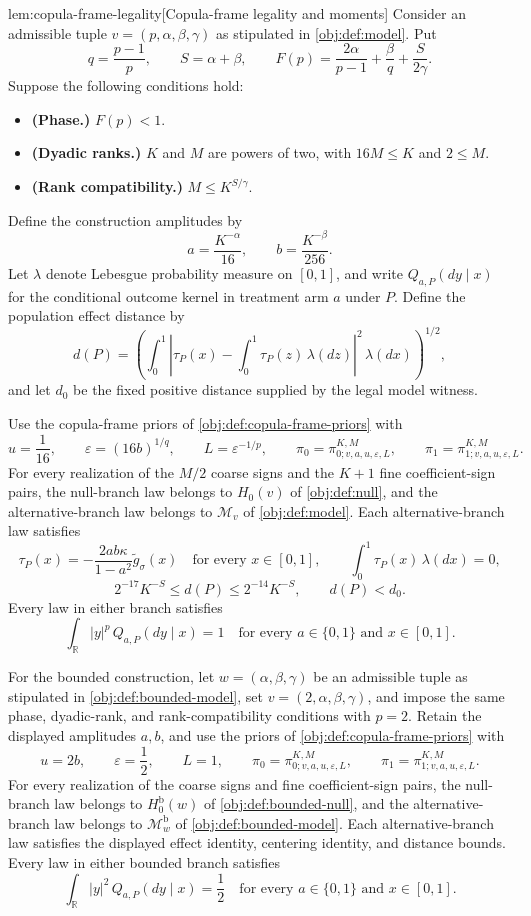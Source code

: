 \documentclass[11pt]{article}
\begin{document}
\begin{lemmav}{lem:copula-frame-legality}[Copula-frame legality and moments]
Consider an admissible tuple \(v=(p,\alpha,\beta,\gamma)\) as stipulated in \cref{obj:def:model}. Put
\[
q=\frac{p-1}{p},\qquad S=\alpha+\beta,\qquad
F(p)=\frac{2\alpha}{p-1}+\frac{\beta}{q}+\frac{S}{2\gamma}.
\]
Suppose the following conditions hold:
\begin{itemize}
\item \textbf{(Phase.)} \(F(p)<1\).
\item \textbf{(Dyadic ranks.)} \(K\) and \(M\) are powers of two, with \(16M\le K\) and \(2\le M\).
\item \textbf{(Rank compatibility.)} \(M\le K^{S/\gamma}\).
\end{itemize}
Define the construction amplitudes by
\[
a=\frac{K^{-\alpha}}{16},\qquad b=\frac{K^{-\beta}}{256}.
\]
Let \(\lambda\) denote Lebesgue probability measure on \([0,1]\), and write \(Q_{a,P}(dy\mid x)\) for the conditional outcome kernel in treatment arm \(a\) under \(P\). Define the population effect distance by
\[
d(P)=
\left(
\int_0^1
\left|\tau_P(x)-\int_0^1\tau_P(z)\,\lambda(dz)\right|^2
\,\lambda(dx)
\right)^{1/2},
\]
and let \(d_0\) be the fixed positive distance supplied by the legal model witness.

Use the copula-frame priors of \cref{obj:def:copula-frame-priors} with
\[
u=\frac1{16},\qquad
\varepsilon=(16b)^{1/q},\qquad L=\varepsilon^{-1/p},
\qquad
\pi_0=\pi^{K,M}_{0;v,a,u,\varepsilon,L},\qquad
\pi_1=\pi^{K,M}_{1;v,a,u,\varepsilon,L}.
\]
For every realization of the \(M/2\) coarse signs and the \(K+1\) fine coefficient-sign pairs, the null-branch law belongs to \(H_0(v)\) of \cref{obj:def:null}, and the alternative-branch law belongs to \(\mathcal M_v\) of \cref{obj:def:model}. Each alternative-branch law satisfies
\[
\tau_P(x)=-\frac{2ab\kappa}{1-a^2}\widetilde g_\sigma(x)
\quad\text{for every }x\in[0,1],
\qquad
\int_0^1\tau_P(x)\,\lambda(dx)=0,
\]
\[
2^{-17}K^{-S}\le d(P)\le 2^{-14}K^{-S},
\qquad d(P)<d_0.
\]
Every law in either branch satisfies
\[
\int_{\mathbb R}|y|^p\,Q_{a,P}(dy\mid x)=1
\quad\text{for every }a\in\{0,1\}\text{ and }x\in[0,1].
\]

For the bounded construction, let \(w=(\alpha,\beta,\gamma)\) be an admissible tuple as stipulated in \cref{obj:def:bounded-model}, set \(v=(2,\alpha,\beta,\gamma)\), and impose the same phase, dyadic-rank, and rank-compatibility conditions with \(p=2\). Retain the displayed amplitudes \(a,b\), and use the priors of \cref{obj:def:copula-frame-priors} with
\[
u=2b,\qquad \varepsilon=\frac12,\qquad L=1,
\qquad
\pi_0=\pi^{K,M}_{0;v,a,u,\varepsilon,L},\qquad
\pi_1=\pi^{K,M}_{1;v,a,u,\varepsilon,L}.
\]
For every realization of the coarse signs and fine coefficient-sign pairs, the null-branch law belongs to \(H_0^{\mathrm b}(w)\) of \cref{obj:def:bounded-null}, and the alternative-branch law belongs to \(\mathcal M^{\mathrm b}_w\) of \cref{obj:def:bounded-model}. Each alternative-branch law satisfies the displayed effect identity, centering identity, and distance bounds. Every law in either bounded branch satisfies
\[
\int_{\mathbb R}|y|^2\,Q_{a,P}(dy\mid x)=\frac12
\quad\text{for every }a\in\{0,1\}\text{ and }x\in[0,1].
\]
\end{lemmav}
\end{document}
